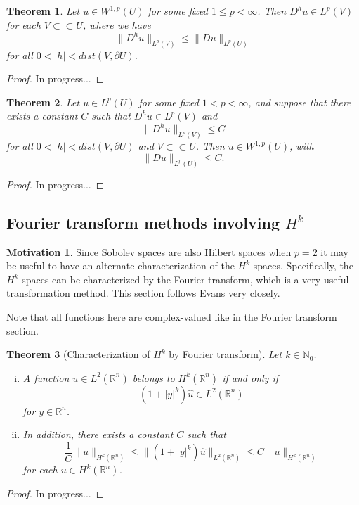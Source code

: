 \documentclass[11pt]{article}
\newtheorem{theorem}{Theorem}
\theoremstyle{definition}
\newtheorem*{motivation}{Motivation}
\begin{document}
\begin{theorem}
	Let $u \in W^{1,p}(U)$ for some fixed $1 \leq p < \infty$. Then $D^hu \in L^p(V)$ for each $V \subset\subset U$, where we have
	\begin{equation*}
		\|D^hu\|_{L^p(V)} \leq \|Du\|_{L^p(U)}
	\end{equation*}
	for all $0 < |h| < dist(V,\partial U)$.
\end{theorem}
\begin{proof}
	In progress...
\end{proof}

\begin{theorem}
	Let $u \in L^p(U)$ for some fixed $1 < p < \infty$, and suppose that there exists a constant $C$ such that
	$D^hu \in L^p(V)$ and 
	\begin{equation*}
		\|D^hu\|_{L^p(V)} \leq C
	\end{equation*}
	for all $0 < |h| < dist(V,\partial U)$ and $V \subset\subset U$.
	Then $u \in W^{1,p}(U)$, with
	\begin{equation*}
		\|Du\|_{L^p(U)} \leq C.
	\end{equation*}
\end{theorem}
\begin{proof}
	In progress...
\end{proof}

\newpage

\subsection{Fourier transform methods involving $H^k$}
\begin{motivation}
	Since Sobolev spaces are also Hilbert spaces when $p=2$ it may be useful to have an alternate characterization of the $H^k$ spaces.
	Specifically, the $H^k$ spaces can be characterized by the Fourier transform, which is a very useful transformation method.
	This section follows Evans \cite{evans1998partial} very closely.
\end{motivation}
Note that all functions here are complex-valued like in the Fourier transform section.
\begin{theorem}[Characterization of $H^k$ by Fourier transform]
	Let $k \in \mathbb{N}_0$.
	\begin{enumerate}[(i)]
		\item A function $u \in L^2(\mathbb{R}^n)$ belongs to $H^k(\mathbb{R}^n)$ if and only if
			\begin{equation}
				(1+|y|^k)\hat{u} \in L^2(\mathbb{R}^n)
			\end{equation}
			for $y \in \mathbb{R}^n$.
		\item In addition, there exists a constant $C$ such that
			\begin{equation}
				\frac{1}{C}\|u\|_{H^k(\mathbb{R}^n)} \leq \|(1+|y|^k)\hat{u}\|_{L^2(\mathbb{R}^n)} \leq C\|u\|_{H^k(\mathbb{R}^n)}
			\end{equation}
			for each $u \in H^k(\mathbb{R}^n)$.
	\end{enumerate}
\end{theorem}
\begin{proof}
	In progress...
\end{proof}
\end{document}
